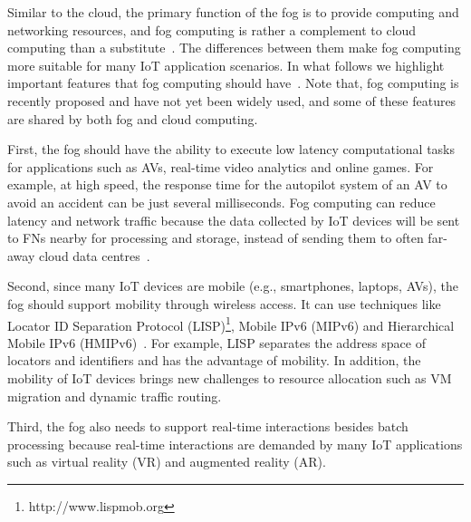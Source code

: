 \documentclass[11pt]{phdthesis}
\begin{document}
Similar to the cloud, the primary function of the fog is to provide computing and networking resources, and fog computing is rather a complement to cloud computing than a substitute~\citep{matt2018fog}. The differences between them make fog computing more suitable for many IoT application scenarios. In what follows we highlight important features that fog computing should have~\citep{bonomi2012fog}. Note that, fog computing is recently proposed and have not yet been widely used, and some of these features are shared by both fog and cloud computing.  

First, the fog should have the ability to execute low latency computational tasks for applications such as AVs, real-time video analytics and online games. For example, at high speed, the response time for the autopilot system of an AV to avoid an accident can be just several milliseconds. Fog computing can reduce latency and network traffic because the data collected by IoT devices will be sent to FNs nearby for processing and storage, instead of sending them to often far-away cloud data centres~\citep{atlam2018fog}.

Second, since many IoT devices are mobile (e.g., smartphones, laptops, AVs), the fog should support mobility through wireless access. It can use techniques like Locator ID Separation Protocol (LISP)\footnote{http://www.lispmob.org}, Mobile IPv6 (MIPv6) and  Hierarchical Mobile IPv6 (HMIPv6)~\citep{liu2015distributed}. For example, LISP separates the address space of locators and identifiers and has the advantage of mobility. In addition, the mobility of IoT devices brings new challenges to resource allocation such as VM migration and dynamic traffic routing.

Third, the fog also needs to support real-time interactions besides batch processing because real-time interactions are demanded by many IoT applications such as virtual reality (VR) and augmented reality (AR).
\end{document}
